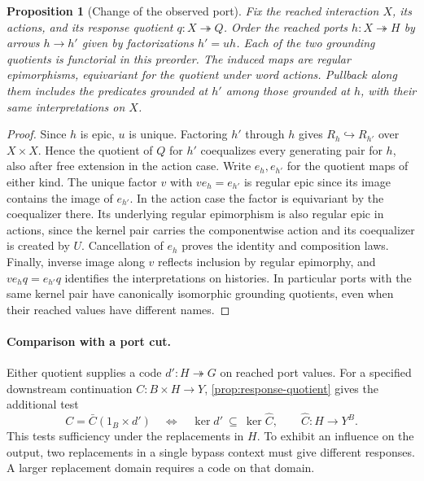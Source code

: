 \documentclass[11pt,a4paper]{article}
\newtheorem{proposition}[proposition]{Proposition}
\theoremstyle{definition}
\theoremstyle{remark}\newaliascnt{remark}{theorem}
\numberwithin{equation}{section}
\begin{document}
\begin{proposition}[Change of the observed port]\label{prop:ground-port-change}
Fix the reached interaction \(X\), its actions, and its response quotient \(q:X\twoheadrightarrow Q\). Order the reached ports \(h:X\twoheadrightarrow H\) by arrows \(h\to h'\) given by factorizations \(h'=u h\). Each of the two grounding quotients is functorial in this preorder. The induced maps are regular epimorphisms, equivariant for the quotient under word actions. Pullback along them includes the predicates grounded at \(h'\) among those grounded at \(h\), with their same interpretations on \(X\).
\end{proposition}
\begin{proof}
Since \(h\) is epic, \(u\) is unique. Factoring \(h'\) through \(h\) gives \(R_h\hookrightarrow R_{h'}\) over \(X\times X\). Hence the quotient of \(Q\) for \(h'\) coequalizes every generating pair for \(h\), also after free extension in the action case. Write \(e_h,e_{h'}\) for the quotient maps of either kind. The unique factor \(v\) with \(v e_h=e_{h'}\) is regular epic since its image contains the image of \(e_{h'}\). In the action case the factor is equivariant by the coequalizer there. Its underlying regular epimorphism is also regular epic in actions, since the kernel pair carries the componentwise action and its coequalizer is created by \(U\). Cancellation of \(e_h\) proves the identity and composition laws. Finally, inverse image along \(v\) reflects inclusion by regular epimorphy, and \(v e_h q=e_{h'}q\) identifies the interpretations on histories. In particular ports with the same kernel pair have canonically isomorphic grounding quotients, even when their reached values have different names.
\end{proof}

\paragraph{Comparison with a port cut.}
Either quotient supplies a code $d':H\twoheadrightarrow G$ on reached port values. For a specified downstream continuation $C:B\times H\to Y$, \cref{prop:response-quotient} gives the additional test
\[
 C=\bar C(1_B\times d')\quad\Longleftrightarrow\quad
                 \ker d'\ \subseteq\ \ker\widehat C,
 \qquad \widehat C:H\to Y^B .
\]
This tests sufficiency under the replacements in $H$. To exhibit an influence on the output, two replacements in a single bypass context must give different responses. A larger replacement domain requires a code on that domain.
\end{document}

